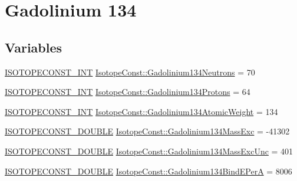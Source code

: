 \hypertarget{group___isotope_const-_gadolinium-_gd134}{}\section{Gadolinium 134}
\label{group___isotope_const-_gadolinium-_gd134}
\subsection*{Variables}
\begin{DoxyCompactItemize}
\item 
\mbox{\hyperlink{group___isotope_const-_macros_ga5f18360b3e99483a35c32d789e62621c}{I\+S\+O\+T\+O\+P\+E\+C\+O\+N\+S\+T\+\_\+\+I\+NT}} \mbox{\hyperlink{group___isotope_const-_gadolinium-_gd134_ga5379653f271ae39943d0c45fb48f7ef8}{Isotope\+Const\+::\+Gadolinium134\+Neutrons}} = 70
\item 
\mbox{\hyperlink{group___isotope_const-_macros_ga5f18360b3e99483a35c32d789e62621c}{I\+S\+O\+T\+O\+P\+E\+C\+O\+N\+S\+T\+\_\+\+I\+NT}} \mbox{\hyperlink{group___isotope_const-_gadolinium-_gd134_ga08653d091487b1f74a8a8a82caadd2c5}{Isotope\+Const\+::\+Gadolinium134\+Protons}} = 64
\item 
\mbox{\hyperlink{group___isotope_const-_macros_ga5f18360b3e99483a35c32d789e62621c}{I\+S\+O\+T\+O\+P\+E\+C\+O\+N\+S\+T\+\_\+\+I\+NT}} \mbox{\hyperlink{group___isotope_const-_gadolinium-_gd134_ga09762e5098f2624f48c3bb1018b0ecf3}{Isotope\+Const\+::\+Gadolinium134\+Atomic\+Weight}} = 134
\item 
\mbox{\hyperlink{group___isotope_const-_macros_ga8f45a7272ce02c0b4c65c44636ed719a}{I\+S\+O\+T\+O\+P\+E\+C\+O\+N\+S\+T\+\_\+\+D\+O\+U\+B\+LE}} \mbox{\hyperlink{group___isotope_const-_gadolinium-_gd134_ga61730ce7c763df1f5a186f3af18690cd}{Isotope\+Const\+::\+Gadolinium134\+Mass\+Exc}} = -\/41302
\item 
\mbox{\hyperlink{group___isotope_const-_macros_ga8f45a7272ce02c0b4c65c44636ed719a}{I\+S\+O\+T\+O\+P\+E\+C\+O\+N\+S\+T\+\_\+\+D\+O\+U\+B\+LE}} \mbox{\hyperlink{group___isotope_const-_gadolinium-_gd134_ga2efe97db2ab39b32526c2e6ad746528d}{Isotope\+Const\+::\+Gadolinium134\+Mass\+Exc\+Unc}} = 401
\item 
\mbox{\hyperlink{group___isotope_const-_macros_ga8f45a7272ce02c0b4c65c44636ed719a}{I\+S\+O\+T\+O\+P\+E\+C\+O\+N\+S\+T\+\_\+\+D\+O\+U\+B\+LE}} \mbox{\hyperlink{group___isotope_const-_gadolinium-_gd134_ga1d6f3b1afa9dd2c1abeace3d82446557}{Isotope\+Const\+::\+Gadolinium134\+Bind\+E\+PerA}} = 8006
\item 

\end{DoxyCompactItemize}
